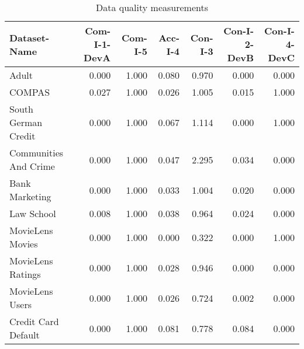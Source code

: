 \begin{table}[t]
\caption{Data quality measurements}
\label{tab:dataquality}
\begin{tabular}{|p{2cm}|r|r|r|r|r|r|}
\hline
Dataset-Name & Com-I-1-DevA & Com-I-5 & Acc-I-4 & Con-I-3 & Con-I-2-DevB & Con-I-4-DevC \\
\hline
Adult & 0.000 & 1.000 & 0.080 & 0.970 & 0.000 & 0.000 \\
COMPAS & 0.027 & 1.000 & 0.026 & 1.005 & 0.015 & 1.000 \\
South German Credit & 0.000 & 1.000 & 0.067 & 1.114 & 0.000 & 1.000 \\
Communities And Crime & 0.000 & 1.000 & 0.047 & 2.295 & 0.034 & 0.000 \\
Bank Marketing & 0.000 & 1.000 & 0.033 & 1.004 & 0.020 & 0.000 \\
Law School & 0.008 & 1.000 & 0.038 & 0.964 & 0.024 & 0.000 \\
MovieLens Movies & 0.000 & 1.000 & 0.000 & 0.322 & 0.000 & 1.000 \\
MovieLens Ratings & 0.000 & 1.000 & 0.028 & 0.946 & 0.000 & 0.000 \\
MovieLens Users & 0.000 & 1.000 & 0.026 & 0.724 & 0.002 & 0.000 \\
Credit Card Default & 0.000 & 1.000 & 0.081 & 0.778 & 0.084 & 0.000 \\
\hline
\end{tabular}
\end{table}
